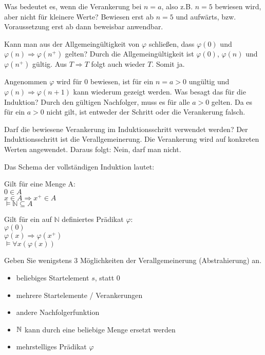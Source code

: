 \begin{card}
	Was bedeutet es, wenn die Verankerung bei $n=a$, also z.B. $n=5$ bewiesen wird, aber nicht für kleinere Werte?
	\hr
	Bewiesen erst ab $n=5$ und aufwärts, bzw. Voraussetzung erst ab dann beweisbar anwendbar.
\end{card}

\begin{card}
	Kann man aus der Allgemeingültigkeit von $\varphi$ schließen, dass $\varphi (0)$ und $\varphi (n)\Rightarrow \varphi (n^+)$ gelten?
	\hr
  Durch die Allgemeingültigkeit ist $\varphi(0)$, $\varphi(n)$ und $\varphi(n^+)$ gültig. Aus $T \Rightarrow T$ folgt auch wieder $T$. Somit ja.
\end{card}

\begin{card}
	Angenommen $\varphi$ wird für 0 bewiesen, ist für ein $n= a > 0$ ungültig und $\varphi(n) \Rightarrow \varphi(n+1)$ kann wiederum gezeigt werden. Was besagt das für die Induktion?
	\hr
	Durch den gültigen Nachfolger, muss es für alle $a > 0$ gelten. Da es für ein $a > 0$ nicht gilt, ist entweder der
	Schritt oder die Verankerung falsch.
\end{card}

\begin{card}
	Darf die bewiesene Verankerung im Induktionsschritt verwendet werden?
	\hr
	Der Induktionsschritt ist die Verallgemeinerung. Die Verankerung wird auf konkreten Werten angewendet. Daraus folgt: Nein, darf man nicht.
\end{card}

\begin{card}
	Das Schema der vollständigen Induktion lautet:\\
  \begin{minipage}[t]{0.48\textwidth}
    Gilt für eine Menge A:\\
    $0 \in A$\\
    $x \in A \Rightarrow x^+ \in A$\\
    $\vDash \mathbb{N} \subseteq A$\\
	\end{minipage}
  \begin{minipage}[t]{0.48\textwidth}
    Gilt für ein auf $\mathbb{N}$ definiertes Prädikat $\varphi$:\\
    $\varphi(0)$\\
    $\varphi(x) \Rightarrow \varphi(x^+)$\\
    $\vDash \forall x (\varphi(x))$\\
	\end{minipage}
	Geben Sie wenigstens 3 Möglichkeiten der Verallgemeinerung (Abstrahierung) an.
	\hr
	\begin{itemize}
    \item beliebiges Startelement $s$, statt 0
    \item mehrere Startelemente / Verankerungen
    \item andere Nachfolgerfunktion
    \item $\mathbb{N}$ kann durch eine beliebige Menge ersetzt werden
    \item mehrstelliges Prädikat $\varphi$
	\end{itemize}
\end{card}
